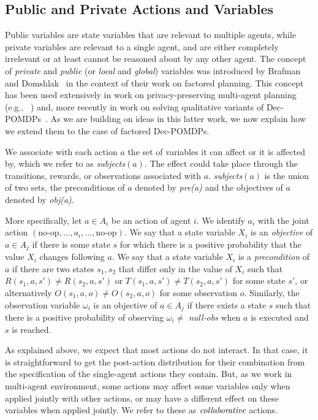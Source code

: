 \documentclass[letterpaper]{article} %
\begin{document}
\subsection{Public and Private Actions and Variables}

Public variables are state variables that are relevant to multiple agents, while private variables are relevant to a single agent, and are either completely irrelevant or at least cannot be reasoned about by any other agent.
The concept of \emph{private} and \emph{public} (or \emph{local} and \emph{global}) variables was introduced by
Brafman and Domshlak~\cite{} in the context of their work on factored planning. This concept has been used extensively
in work on privacy-preserving multi-agent planning (e.g., ~\cite{}) and, more recently in work on solving qualitative variants of Dec-POMDPs~\cite{}. As we are building on ideas in this latter work, we now explain how we extend them to the
case of factored Dec-POMDPs.

We associate with each action $a$ the set of variables it can affect or it is affected by, which we refer to as  {\em subjects}$(a)$. The effect could take place through the transitions, rewards, or observations associated with $a$. {\em subjects}$(a)$ is the union of two sets, the preconditions of $a$ denoted by {\em pre(a)} and the objectives of $a$ denoted by {\em obj(a)}. 

More specifically, let $a\in A_i$ be an action of agent $i$. We identify $a_i$ with the joint action $(\mbox{no-op},\ldots, a_i,\ldots,\mbox{no-op})$.
We say that a state variable $X_i$ is an {\em objective} of $a\in A_j$ if there is some state $s$ for which there is a positive probability that the value 
$X_i$ changes following $a$. We say that a state variable $X_i$ is a {\em precondition} of $a$ if there are two states $s_1,s_2$ that differ only in the value of $X_i$ such that $R(s_1,a,s')\neq R(s_2,a,s')$ or $T(s_1,a,s')\neq T(s_2,a,s')$ for some state $s'$, or alternatively $O(s_1,a,o)\neq O(s_2,a,o)$ for some observation $o$.
Similarly, the observation variable $\omega_i$ is an objective of $a\in A_j$ if there exists a state $s$ such that there is a positive probability
of observing $\omega_i \neq$ {\em null-obs} when $a$ is executed and $s$ is reached.

As explained above, we expect that most actions do not interact. In that case, it is straightforward to get the post-action distribution for their combination from the specification of the single-agent actions they contain. But, as we work in multi-agent environment, some actions may affect some variables only when applied jointly with other actions, or may have a different effect on these variables when applied jointly.
We refer to these as $\emph{collaborative}$ actions. 
\end{document}
